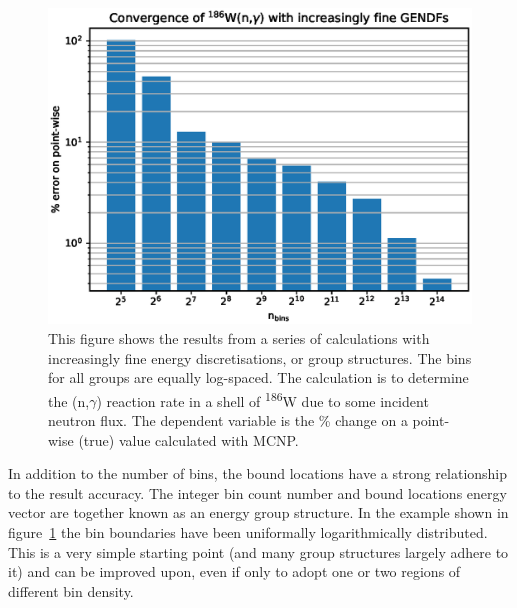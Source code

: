 \begin{figure}[H]
  \centering
  \includegraphics[width=0.9\linewidth]{gendf_convergence}
  \caption{This figure shows the results from a series of calculations with increasingly fine energy discretisations, or group structures. The bins for all groups are equally log-spaced. The calculation is to determine the (n,$\gamma$) reaction rate in a shell of \textsuperscript{186}W due to some incident neutron flux. The dependent variable is the \% change on a point-wise (true) value calculated with MCNP.}
  \label{fig:gendf_convergence}
\end{figure}

In addition to the number of bins, the bound locations have a strong relationship to the result accuracy. The integer bin count number and bound locations energy vector are together known as an energy group structure. In the example shown in figure~\ref{fig:gendf_convergence} the bin boundaries have been uniformally logarithmically distributed. This is a very simple starting point (and many group structures largely adhere to it) and can be improved upon, even if only to adopt one or two regions of different bin density.

